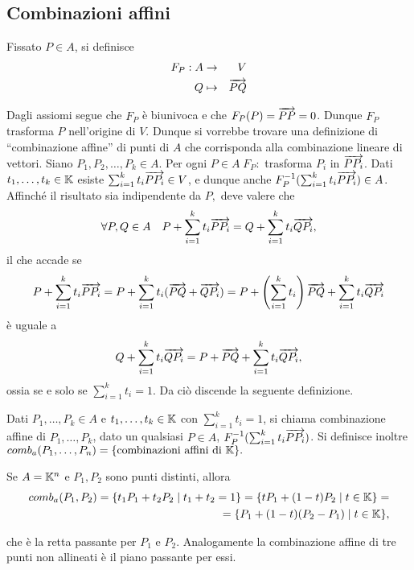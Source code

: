 	\subsection{Combinazioni affini}
 
 Fissato $P\in A$, si definisce
 \begin{eqnarray*}
  F_P: A & \to & V \\
  Q & \mapsto & \overrightarrow{PQ}
 \end{eqnarray*}
 
 Dagli assiomi segue che $F_P$ è biunivoca e che $F_P(P)=\overrightarrow{PP}=0$. Dunque $F_P$ trasforma
 $P$ nell'origine di $V$.
 Dunque si vorrebbe trovare una definizione di ``combinazione affine'' di punti di $A$ che corrisponda alla combinazione
 lineare di vettori. Siano $P_1,P_2,\ldots,P_k\in A$. Per ogni $P\in A\; F_P:$ trasforma
 $P_i$ in $\overrightarrow{PP_i}$.
 Dati $t_1,\ldots,t_k\in \mathbb K$ esiste $\sum_{i=1}^kt_i\overrightarrow{PP_i}\in V$, e dunque anche
 $F_P^{-1}(\sum_{i=1}^kt_i\overrightarrow{PP_i})\in A$.
 Affinché il risultato sia indipendente da $P,$ deve valere che
 $$\forall P,Q\in A\quad P+\sum_{i=1}^kt_i\overrightarrow{PP_i}=Q+\sum_{i=1}^kt_i\overrightarrow{QP_i},$$
 il che accade se
 $$P+\sum_{i=1}^kt_i\overrightarrow{PP_i}=P+\sum_{i=1}^kt_i(\overrightarrow{PQ}+\overrightarrow{QP_i})=P+\left(\sum_{i=1}^kt_i\right)\overrightarrow{PQ}+\sum_{i=1}^kt_i\overrightarrow{QP_i}$$
 è uguale a
 $$Q+\sum_{i=1}^kt_i\overrightarrow{QP_i}=P+\overrightarrow{PQ}+\sum_{i=1}^kt_i\overrightarrow{QP_i},$$
 ossia se e solo se $\sum_{i=1}^kt_i=1$.
 Da ciò discende la seguente definizione.
 
 \begin{definition}
 Dati $P_1,\ldots,P_k\in A$ e $t_1,\ldots,t_k\in \mathbb K$ con $\sum_{i=1}^kt_i=1$,
 si chiama combinazione affine di $P_1,\ldots,P_k$, dato un qualsiasi $P\in A$, 
 $F_P^{-1}(\sum_{i=1}^kt_i\overrightarrow{PP_i})$.
 Si definisce inoltre $comb_a(P_1,\ldots,P_n)=\{\text{combinazioni affini di }\mathbb K\}.$
 \end{definition}
 
 \begin{example}
 Se $A=\mathbb K^n$ e $P_1,P_2$ sono punti distinti, allora
 \begin{eqnarray*}
	comb_a(P_1,P_2)=\{t_1P_1+t_2P_2\;|\;t_1+t_2=1\}=\{tP_1+(1-t)P_2\;|\; t\in \mathbb K\}=\\
	=\{P_1+(1-t)(P_2-P_1)\;|\; t\in \mathbb K\},
 \end{eqnarray*}
 \end{example}

 che è la retta passante per $P_1$ e $P_2.$ Analogamente la combinazione affine di tre punti non allineati
 è il piano passante per essi.
 
